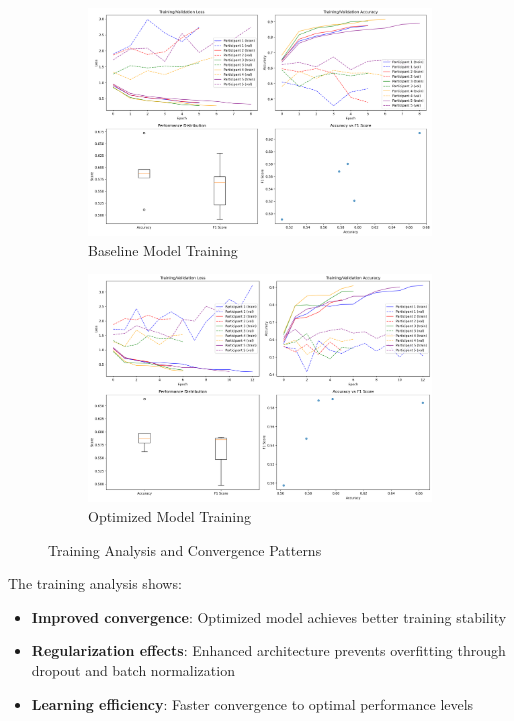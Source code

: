 \documentclass[a4paper,11pt]{article}
\begin{document}
\begin{figure}[H]
\centering
\begin{subfigure}{0.48\textwidth}
    \centering
    \includegraphics[width=\textwidth]{results/metrics/baseline/training_analysis.png}
    \caption{Baseline Model Training}
    \label{fig:baseline_training}
\end{subfigure}
\hfill
\begin{subfigure}{0.48\textwidth}
    \centering
    \includegraphics[width=\textwidth]{results/metrics/optimized/training_analysis.png}
    \caption{Optimized Model Training}
    \label{fig:optimized_training}
\end{subfigure}
\caption{Training Analysis and Convergence Patterns}
\label{fig:training_analysis}
\end{figure}

The training analysis shows:
\begin{itemize}
\item \textcolor{improvement}{\textbf{Improved convergence}}: Optimized model achieves better training stability
\item \textbf{Regularization effects}: Enhanced architecture prevents overfitting through dropout and batch normalization
\item \textbf{Learning efficiency}: Faster convergence to optimal performance levels
\end{itemize}
\end{document}
